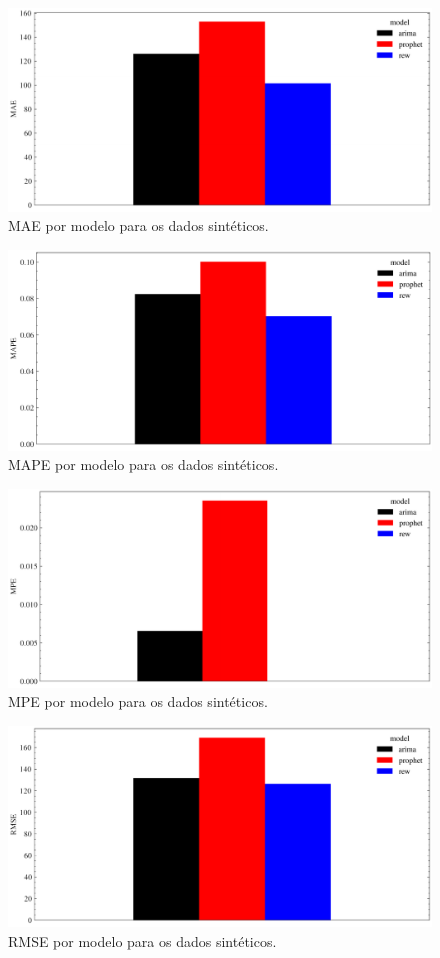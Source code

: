 \begin{figure}[!htp]
    \centering
    \includegraphics[width=5.0in]{img/synthetic_mae_comparison.pdf}
    \caption{MAE por modelo para os dados sintéticos.}
\end{figure}

\begin{figure}[!htp]
    \centering
    \includegraphics[width=5.0in]{img/synthetic_mape_comparison.pdf}
    \caption{MAPE por modelo para os dados sintéticos.}
\end{figure}

\begin{figure}[!htp]
    \centering
    \includegraphics[width=5.0in]{img/synthetic_mpe_comparison.pdf}
    \caption{MPE por modelo para os dados sintéticos.}
\end{figure}

\begin{figure}[!htp]
    \centering
    \includegraphics[width=5.0in]{img/synthetic_rmse_comparison.pdf}
    \caption{RMSE por modelo para os dados sintéticos.}
\end{figure}
